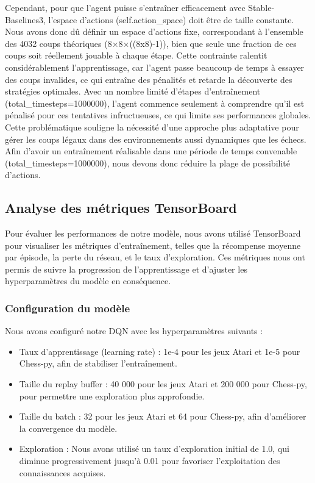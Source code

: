 \documentclass{article}
\begin{document}
    Cependant, pour que l'agent puisse s'entraîner efficacement avec Stable-Baselines3, l'espace d'actions (self.action\_space) doit être de taille constante. Nous avons donc dû définir un espace d'actions fixe, correspondant à l'ensemble des 4032 coups théoriques (8×8×((8x8)-1)), bien que seule une fraction de ces coups soit réellement jouable à chaque étape. Cette contrainte ralentit considérablement l'apprentissage, car l'agent passe beaucoup de temps à essayer des coups invalides, ce qui entraîne des pénalités et retarde la découverte des stratégies optimales. Avec un nombre limité d'étapes d'entraînement (total\_timesteps=1000000), l'agent commence seulement à comprendre qu'il est pénalisé pour ces tentatives infructueuses, ce qui limite ses performances globales. Cette problématique souligne la nécessité d'une approche plus adaptative pour gérer les coups légaux dans des environnements aussi dynamiques que les échecs.\\
    
    Afin d'avoir un entraînement réalisable dans une période de temps convenable (total\_timesteps=1000000), nous devons donc réduire la plage de possibilité d’actions.


\subsection{Analyse des métriques TensorBoard}

\quad Pour évaluer les performances de notre modèle, nous avons utilisé TensorBoard pour visualiser les métriques d'entraînement, telles que la récompense moyenne par épisode, la perte du réseau, et le taux d'exploration. Ces métriques nous ont permis de suivre la progression de l'apprentissage et d'ajuster les hyperparamètres du modèle en conséquence.

    \subsubsection{Configuration du modèle}

    \quad Nous avons configuré notre DQN avec les hyperparamètres suivants :
    \begin{itemize} 
        \item Taux d'apprentissage (learning rate) : 1e-4 pour les jeux Atari et 1e-5 pour Chess-py, afin de stabiliser l'entraînement.
        \item Taille du replay buffer : 40 000 pour les jeux Atari et 200 000 pour Chess-py, pour permettre une exploration plus approfondie.
        \item Taille du batch : 32 pour les jeux Atari et 64 pour Chess-py, afin d'améliorer la convergence du modèle.
        \item Exploration : Nous avons utilisé un taux d'exploration initial de 1.0, qui diminue progressivement jusqu'à 0.01 pour favoriser l'exploitation des connaissances acquises.
    \end{itemize}
\end{document}
